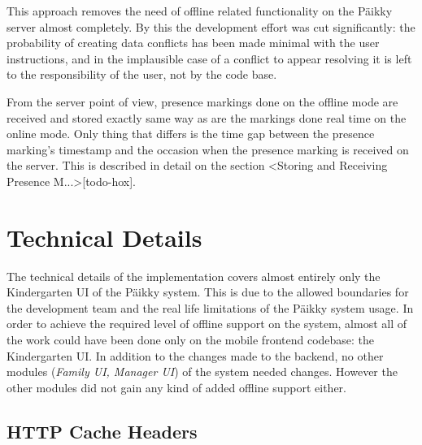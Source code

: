 This approach removes the need of offline related functionality on the Päikky server almost completely. By this the development effort was cut significantly: the probability of creating data conflicts has been made minimal with the user instructions, and in the implausible case of a conflict to appear resolving it is left to the responsibility of the user, not by the code base. 

From the server point of view, presence markings done on the offline mode are received and stored exactly same way as are the markings done real time on the online mode. Only thing that differs is the time gap between the presence marking's timestamp and the occasion when the presence marking is received on the server. This is described in detail on the section <Storing and Receiving Presence M...>[todo-hox]. %





\section{Technical Details}
The technical details of the implementation covers almost entirely only the Kindergarten UI of the Päikky system. This is due to the allowed boundaries for the development team and the real life limitations of the Päikky system usage. In order to achieve the required level of offline support on the system, almost all of the work could have been done only on the mobile frontend codebase: the Kindergarten UI. In addition to the changes made to the backend, no other modules (\textit{Family UI, Manager UI}) of the system needed changes. However the other modules did not gain any kind of added offline support either.


\subsection{HTTP Cache Headers}

